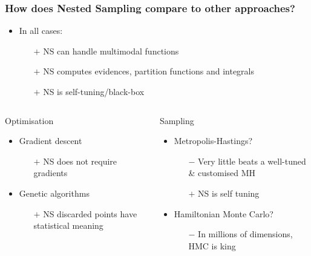 \documentclass[aspectratio=169]{beamer}
\begin{document}
\begin{frame}
    \frametitle{How does Nested Sampling compare to other approaches?}
    \begin{itemize}
        \item In all cases:
            \begin{itemize}
                \item[$+$] NS can handle multimodal functions
                \item[$+$] NS computes evidences, partition functions and integrals
                \item[$+$] NS is self-tuning/black-box
            \end{itemize}
    \end{itemize}
    \vspace{-10pt}
    \begin{columns}[t]
        \begin{block}{Optimisation}
        \begin{itemize}
            \item Gradient descent
                \begin{itemize}
                    \item[$+$] NS does not require gradients
                \end{itemize}
            \item Genetic algorithms
                \begin{itemize}
                    \item[$+$] NS discarded points have statistical meaning
                \end{itemize}
        \end{itemize}
        \end{block}
        \begin{block}{Sampling}
        \begin{itemize}
            \item Metropolis-Hastings?
                \begin{itemize}
                    \item[$-$] Very little beats a well-tuned \& customised MH
                    \item[$+$] NS is self tuning
                \end{itemize}
        \item Hamiltonian Monte Carlo?
        \begin{itemize}
            \item[$-$] In millions of dimensions, HMC is king

\end{itemize}
\end{itemize}
\end{block}
\end{columns}
\end{frame}
\end{document}

